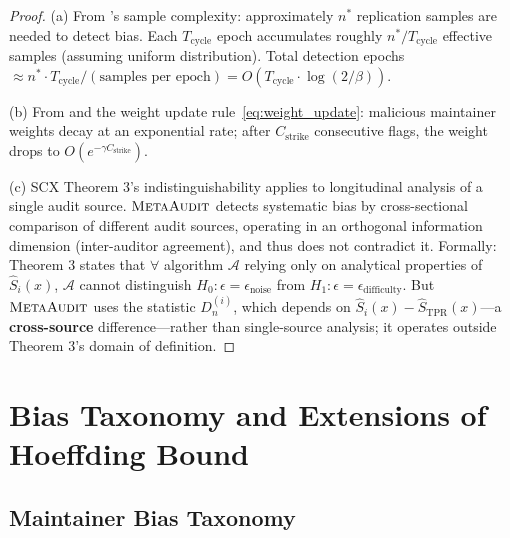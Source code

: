 \documentclass[11pt,a4paper]{article}
\theoremstyle{definition}
\newcommand{\MetaAudit}{\textsc{MetaAudit}}
\begin{document}
\begin{proof}
(a) From 's sample complexity: approximately $n^*$ replication samples are needed to detect bias. Each $T_{\text{cycle}}$ epoch accumulates roughly $n^* / T_{\text{cycle}}$ effective samples (assuming uniform distribution). Total detection epochs $\approx n^* \cdot T_{\text{cycle}} / (\text{samples per epoch}) = O(T_{\text{cycle}} \cdot \log(2/\beta))$.

(b) From  and the weight update rule~\eqref{eq:weight_update}: malicious maintainer weights decay at an exponential rate; after $C_{\text{strike}}$ consecutive flags, the weight drops to $O(e^{-\gamma C_{\text{strike}}})$.

(c) SCX Theorem 3's indistinguishability applies to longitudinal analysis of a single audit source. $\MetaAudit$ detects systematic bias by cross-sectional comparison of different audit sources, operating in an orthogonal information dimension (inter-auditor agreement), and thus does not contradict it. Formally: Theorem 3 states that $\forall$ algorithm $\mathcal{A}$ relying only on analytical properties of $\hat{S}_i(x)$, $\mathcal{A}$ cannot distinguish $H_0: \epsilon = \epsilon_{\text{noise}}$ from $H_1: \epsilon = \epsilon_{\text{difficulty}}$. But $\MetaAudit$ uses the statistic $D_n^{(i)}$, which depends on $\hat{S}_i(x) - \hat{S}_{\text{TPR}}(x)$---a \textbf{cross-source} difference---rather than single-source analysis; it operates outside Theorem 3's domain of definition.
\end{proof}

\section{Bias Taxonomy and Extensions of Hoeffding Bound}

\subsection{Maintainer Bias Taxonomy}
\end{document}
